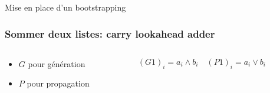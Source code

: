 \documentclass[10pt,xcolor={usenames,dvipsnames}]{beamer}
\begin{document}
\begin{section}{Mise en place d'un bootstrapping}

\begin{frame} 
\frametitle{Sommer deux listes: carry lookahead adder}
  \begin{figure}
    \begin{center}
      \begin{tikzpicture}[scale = 0.5, transform shape]
      	
      \end{tikzpicture}
    \end{center}
  \end{figure}


\begin{columns}
\begin{column}{0.4\textwidth}
\pause
\begin{itemize}
\item $G$ pour génération
  \begin{figure}
    \begin{center}
      \begin{tikzpicture}[scale = 0.6, transform shape]
      	
      \end{tikzpicture}
    \end{center}
  \end{figure}
\item $P$ pour propagation
  \begin{figure}
    \begin{center}
      \begin{tikzpicture}[scale = 0.6, transform shape]
      	
      \end{tikzpicture}
    \end{center}
  \end{figure}
\end{itemize}
\end{column}

\begin{column}{0.6\textwidth}  %
\pause


$(G1)_i = a_i \wedge b_i \quad (P1)_i = a_i \vee b_i$
\pause

  \begin{figure}
    \begin{center}
      \begin{tikzpicture}[scale = 0.9, transform shape]
      	
      \end{tikzpicture}
    \end{center}
  \end{figure}


\end{column}
\end{columns}
\end{frame}
\end{section}
\end{document}
